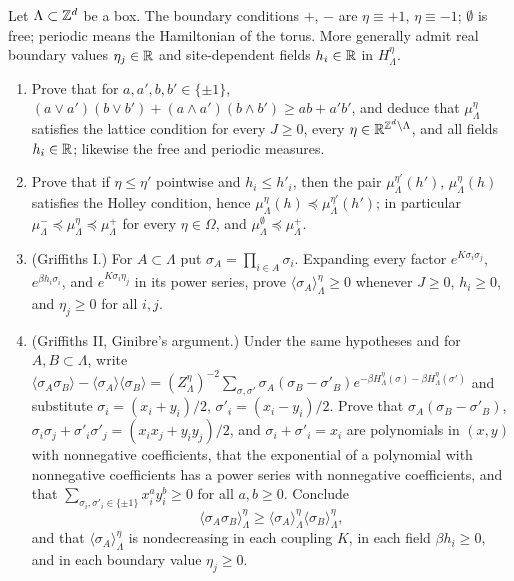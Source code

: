 \begin{exercise}
Let $\Lambda\subset\mathbb Z^d$ be a box.  The boundary conditions $+$, $-$ are
$\eta\equiv+1$, $\eta\equiv-1$; $\emptyset$ is free; periodic means the
Hamiltonian of the torus.  More generally admit real boundary values
$\eta_j\in\mathbb R$ and site-dependent fields $h_i\in\mathbb R$ in $H^\eta_\Lambda$.
\begin{enumerate}[label=(\alph*)]
\item Prove that for $a,a',b,b'\in\{\pm1\}$,
$(a\vee a')(b\vee b')+(a\wedge a')(b\wedge b')\ge ab+a'b'$, and deduce that
$\mu^\eta_\Lambda$ satisfies the lattice condition for every $J\ge0$, every
$\eta\in\mathbb R^{\mathbb Z^d\setminus\Lambda}$, and all fields $h_i\in\mathbb R$; likewise the
free and periodic measures.
\item Prove that if $\eta\le\eta'$ pointwise and $h_i\le h'_i$, then the pair
$\mu^{\eta'}_\Lambda(h')$, $\mu^\eta_\Lambda(h)$ satisfies the Holley
condition, hence $\mu^\eta_\Lambda(h)\preceq\mu^{\eta'}_\Lambda(h')$; in
particular $\mu^-_\Lambda\preceq\mu^\eta_\Lambda\preceq\mu^+_\Lambda$ for every
$\eta\in\Omega$, and $\mu^\emptyset_\Lambda\preceq\mu^+_\Lambda$.
\item (Griffiths I.)  For $A\subset\Lambda$ put $\sigma_A=\prod_{i\in A}\sigma_i$.
Expanding every factor $e^{K\sigma_i\sigma_j}$, $e^{\beta h_i\sigma_i}$, and
$e^{K\sigma_i\eta_j}$ in its power series, prove
$\langle\sigma_A\rangle^\eta_\Lambda\ge0$ whenever $J\ge0$, $h_i\ge0$, and
$\eta_j\ge0$ for all $i,j$.
\item (Griffiths II, Ginibre's argument.)  Under the same hypotheses and for
$A,B\subset\Lambda$, write
$\langle\sigma_A\sigma_B\rangle-\langle\sigma_A\rangle\langle\sigma_B\rangle
=(Z^\eta_\Lambda)^{-2}\sum_{\sigma,\sigma'}\sigma_A(\sigma_B-\sigma'_B)
e^{-\beta H^\eta_\Lambda(\sigma)-\beta H^\eta_\Lambda(\sigma')}$
and substitute $\sigma_i=(x_i+y_i)/2$, $\sigma'_i=(x_i-y_i)/2$.  Prove that
$\sigma_A(\sigma_B-\sigma'_B)$, $\sigma_i\sigma_j+\sigma'_i\sigma'_j=(x_ix_j+y_iy_j)/2$,
and $\sigma_i+\sigma'_i=x_i$ are polynomials in $(x,y)$ with nonnegative
coefficients, that the exponential of a polynomial with nonnegative
coefficients has a power series with nonnegative coefficients, and that
$\sum_{\sigma_i,\sigma'_i\in\{\pm1\}}x_i^ay_i^b\ge0$ for all $a,b\ge0$.
Conclude
\[
 \langle\sigma_A\sigma_B\rangle^\eta_\Lambda\ge\langle\sigma_A\rangle^\eta_\Lambda\langle\sigma_B\rangle^\eta_\Lambda ,
\]
and that $\langle\sigma_A\rangle^\eta_\Lambda$ is nondecreasing in each
coupling $K$, in each field $\beta h_i\ge0$, and in each boundary value
$\eta_j\ge0$.
\end{enumerate}
\end{exercise}

